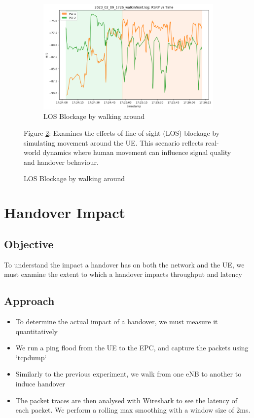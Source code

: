 \begin{figure}[p]
    \vspace{1cm}
    \begin{minipage}{0.45\textwidth}
    \begin{subfigure}{\linewidth}
        \centering
        \includegraphics[width=0.9\linewidth]{src//img/2024_02_09_los_block.png}
        \caption{LOS Blockage by walking around}
        \label{fig:methods:2024-02-09-walking}
    \end{subfigure}
    \end{minipage}
    \begin{minipage}{0.45\textwidth}
        \small{Figure \ref{fig:methods:2024-02-09-walking}: Examines the effects of line-of-sight (LOS) blockage by simulating movement around the UE. This scenario reflects real-world dynamics where human movement can influence signal quality and handover behaviour.}
    \end{minipage}
\end{figure}

\clearpage
\section{Handover Impact}
\subsection{Objective}
To understand the impact a handover has on both the network and the UE, we must examine the extent to which a handover impacts throughput and latency
\subsection{Approach}
\begin{itemize}
    \item To determine the actual impact of a handover, we must measure it quantitatively
    \item We run a ping flood from the UE to the EPC, and capture the packets using `tcpdump`
    \item Similarly to the previous experiment, we walk from one eNB to another to induce handover
    \item The packet traces are then analysed with Wireshark to see the latency of each packet. We perform a rolling max smoothing with a window size of 2ms.
    \end{itemize}
